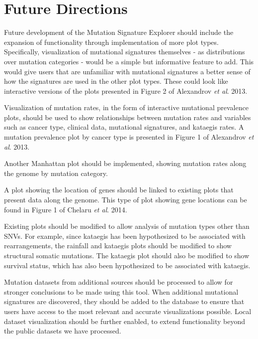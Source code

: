 \documentclass[12pt, letterpaper]{article}
\begin{document}
\section{Future Directions}
Future development of the Mutation Signature Explorer should include the expansion of functionality through implementation of more plot types.
Specifically, visualization of mutational signatures themselves - as distributions over mutation categories - would be a simple but informative feature to add.
This would give users that are unfamiliar with mutational signatures a better sense of how the signatures are used in the other plot types.
These could look like interactive versions of the plots presented in Figure 2 of Alexandrov \textit{et al}. 2013\cite{alexandrov2013signatures}.

Visualization of mutation rates, in the form of interactive mutational prevalence plots, should be used to show relationships between mutation rates and variables such as cancer type, clinical data, mutational signatures, and kataegis rates.
A mutation prevalence plot by cancer type is presented in Figure 1 of Alexandrov \textit{et al}. 2013\cite{alexandrov2013signatures}.

Another Manhattan plot should be implemented, showing mutation rates along the genome by mutation category.

A plot showing the location of genes should be linked to existing plots that present data along the genome.
This type of plot showing gene locations can be found in Figure 1 of Chelaru \textit{et al}. 2014\cite{chelaru2014epiviz}.

Existing plots should be modified to allow analysis of mutation types other than SNVs. 
For example, since kataegis has been hypothesized to be associated with rearrangements, the rainfall and kataegis plots should be modified to show structural somatic mutations. The kataegis plot should also be modified to show survival status, which has also been hypothesized to be associated with kataegis.

Mutation datasets from additional sources should be processed to allow for stronger conclusions to be made using this tool.
When additional mutational signatures are discovered, they should be added to the database to ensure that users have access to the most relevant and accurate visualizations possible.
Local dataset visualization should be further enabled, to extend functionality beyond the public datasets we have processed.


{}

\end{document}
